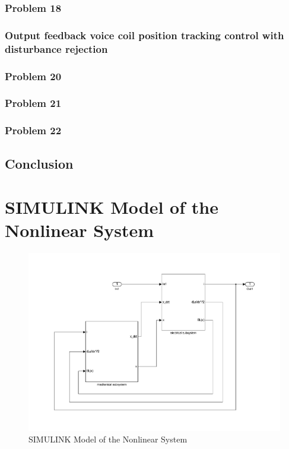 \documentclass[12pt,a4paper,fleqn, onesside]{report}
\begin{document}
\subsection*{Problem 18}


\subsection{Output feedback voice coil position tracking control with disturbance rejection}


\subsection*{Problem 20}


\subsection*{Problem 21}


\subsection*{Problem 22}


\section*{Conclusion}


\appendix

\chapter{SIMULINK Model of the Nonlinear System}
\label{AppP2}
\begin{figure}[H]
 \centering 
 \includegraphics[trim=2cm 2cm 2cm 2cm, clip=true, totalheight=0.47\textheight, angle=0]{figures/figP2.pdf}
 \caption{SIMULINK Model of the Nonlinear System}
\label{fig:figP2}
\end{figure}
\end{document}
